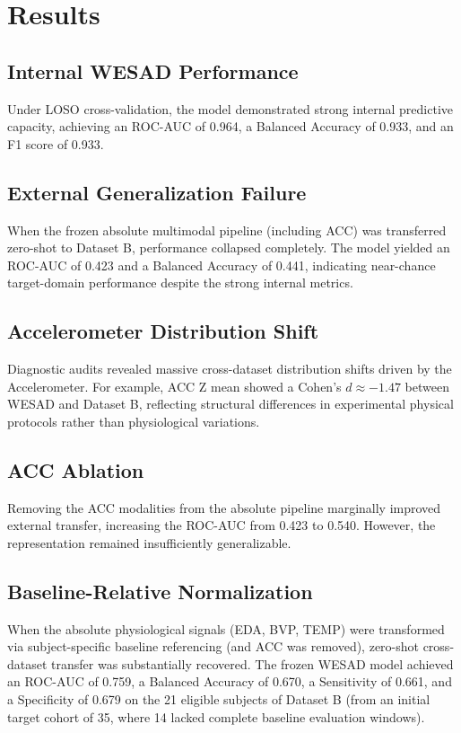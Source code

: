 \documentclass[journal]{IEEEtran}
\begin{document}
\section{Results}

\subsection{Internal WESAD Performance}
Under LOSO cross-validation, the model demonstrated strong internal predictive capacity, achieving an ROC-AUC of 0.964, a Balanced Accuracy of 0.933, and an F1 score of 0.933.

\subsection{External Generalization Failure}
When the frozen absolute multimodal pipeline (including ACC) was transferred zero-shot to Dataset B, performance collapsed completely. The model yielded an ROC-AUC of 0.423 and a Balanced Accuracy of 0.441, indicating near-chance target-domain performance despite the strong internal metrics.

\subsection{Accelerometer Distribution Shift}
Diagnostic audits revealed massive cross-dataset distribution shifts driven by the Accelerometer. For example, ACC Z mean showed a Cohen’s $d \approx -1.47$ between WESAD and Dataset B, reflecting structural differences in experimental physical protocols rather than physiological variations.

\subsection{ACC Ablation}
Removing the ACC modalities from the absolute pipeline marginally improved external transfer, increasing the ROC-AUC from 0.423 to 0.540. However, the representation remained insufficiently generalizable.

\subsection{Baseline-Relative Normalization}
When the absolute physiological signals (EDA, BVP, TEMP) were transformed via subject-specific baseline referencing (and ACC was removed), zero-shot cross-dataset transfer was substantially recovered. The frozen WESAD model achieved an ROC-AUC of 0.759, a Balanced Accuracy of 0.670, a Sensitivity of 0.661, and a Specificity of 0.679 on the 21 eligible subjects of Dataset B (from an initial target cohort of 35, where 14 lacked complete baseline evaluation windows).
\end{document}
